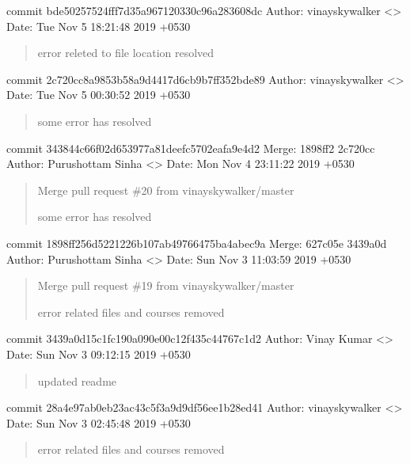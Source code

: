 \documentclass[letterpaper,10pt,english]{sphinxmanual}
\begin{document}
commit bde50257524fff7d35a967120330c96a283608dc
Author: vinayskywalker \textless{}\textgreater{}
Date:   Tue Nov 5 18:21:48 2019 +0530
\begin{quote}

error releted to file location resolved
\end{quote}

commit 2c720cc8a9853b58a9d4417d6cb9b7ff352bde89
Author: vinayskywalker \textless{}\textgreater{}
Date:   Tue Nov 5 00:30:52 2019 +0530
\begin{quote}

some error has resolved
\end{quote}

commit 343844c66f02d653977a81deefc5702eafa9e4d2
Merge: 1898ff2 2c720cc
Author: Purushottam Sinha \textless{}\textgreater{}
Date:   Mon Nov 4 23:11:22 2019 +0530
\begin{quote}

Merge pull request \#20 from vinayskywalker/master

some error has resolved
\end{quote}

commit 1898ff256d5221226b107ab49766475ba4abec9a
Merge: 627c05e 3439a0d
Author: Purushottam Sinha \textless{}\textgreater{}
Date:   Sun Nov 3 11:03:59 2019 +0530
\begin{quote}

Merge pull request \#19 from vinayskywalker/master

error related files and courses removed
\end{quote}

commit 3439a0d15c1fc190a090e00c12f435c44767c1d2
Author: Vinay Kumar \textless{}\textgreater{}
Date:   Sun Nov 3 09:12:15 2019 +0530
\begin{quote}

updated readme
\end{quote}

commit 28a4e97ab0eb23ac43c5f3a9d9df56ee1b28ed41
Author: vinayskywalker \textless{}\textgreater{}
Date:   Sun Nov 3 02:45:48 2019 +0530
\begin{quote}

error related files and courses removed
\end{quote}
\end{document}

